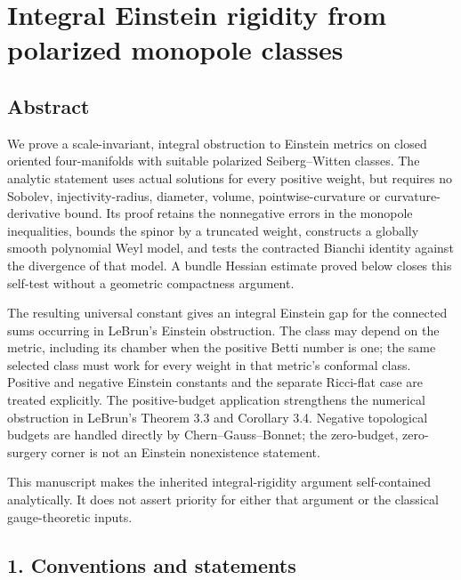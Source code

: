 \documentclass[
  11pt,
]{article}
\author{}
\date{23 September 2026}
\begin{document}
\hypertarget{integral-einstein-rigidity-from-polarized-monopole-classes}{%
\section{Integral Einstein rigidity from polarized monopole
classes}\label{integral-einstein-rigidity-from-polarized-monopole-classes}}

\hypertarget{abstract}{%
\subsection{Abstract}\label{abstract}}

We prove a scale-invariant, integral obstruction to Einstein metrics on
closed oriented four-manifolds with suitable polarized Seiberg--Witten
classes. The analytic statement uses actual solutions for every positive
weight, but requires no Sobolev, injectivity-radius, diameter, volume,
pointwise-curvature or curvature-derivative bound. Its proof retains the
nonnegative errors in the monopole inequalities, bounds the spinor by a
truncated weight, constructs a globally smooth polynomial Weyl model,
and tests the contracted Bianchi identity against the divergence of that
model. A bundle Hessian estimate proved below closes this self-test
without a geometric compactness argument.

The resulting universal constant gives an integral Einstein gap for the
connected sums occurring in LeBrun's Einstein obstruction. The class may
depend on the metric, including its chamber when the positive Betti
number is one; the same selected class must work for every weight in
that metric's conformal class. Positive and negative Einstein constants
and the separate Ricci-flat case are treated explicitly. The
positive-budget application strengthens the numerical obstruction in
LeBrun's Theorem 3.3 and Corollary 3.4. Negative topological budgets are
handled directly by Chern--Gauss--Bonnet; the zero-budget, zero-surgery
corner is not an Einstein nonexistence statement.

This manuscript makes the inherited integral-rigidity argument
self-contained analytically. It does not assert priority for either that
argument or the classical gauge-theoretic inputs.

\hypertarget{conventions-and-statements}{%
\subsection{1. Conventions and
statements}\label{conventions-and-statements}}
\end{document}

